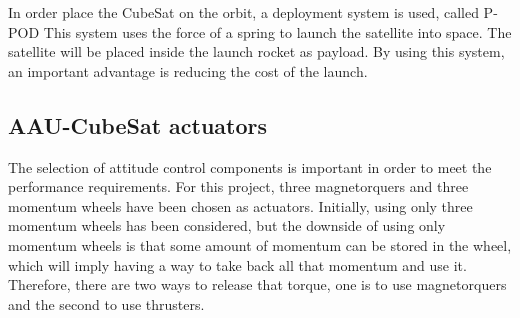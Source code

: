 In order place the CubeSat on the orbit, a deployment system is used, called P-POD  This system uses the force of a spring to launch the satellite into space. The satellite will be placed inside the launch rocket as payload. By using this system, an important advantage is reducing the cost of the launch.
%
\subsection{AAU-CubeSat actuators}
The selection of attitude control components is important in order to meet the performance requirements. For this project, three magnetorquers and three momentum wheels have been chosen as actuators. Initially, using only three momentum wheels has been considered, but the downside of using only momentum wheels is that some amount of momentum can be stored in the wheel, which will imply having a way to take back all that momentum and use it. Therefore, there are two ways to release that torque, one is to use magnetorquers and the second to use thrusters. 

